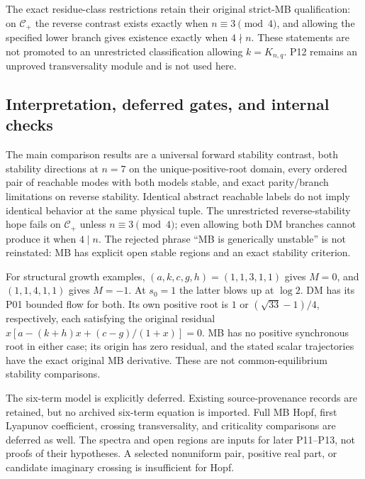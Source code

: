 \documentclass[11pt]{article}
\theoremstyle{definition}
\theoremstyle{remark}
\begin{document}
The exact residue-class restrictions retain their original strict-MB
qualification: on $\mathcal C_+$ the reverse contrast exists exactly
when $n\equiv3\pmod4$, and allowing the specified lower branch gives
existence exactly when $4\nmid n$. These statements are not promoted
to an unrestricted classification allowing $k=K_{n,q}$.
P12 remains an unproved transversality module and is not used here.

\subsection{Interpretation, deferred gates, and internal checks}
\label{slot:P08-6}
The main comparison results are a universal forward stability
contrast, both stability directions at $n=7$ on the unique-positive-root
domain, every ordered pair of reachable modes with both models stable,
and exact parity/branch limitations on reverse stability. Identical
abstract reachable labels do not imply identical behavior at the same
physical tuple. The unrestricted reverse-stability hope fails on
$\mathcal C_+$ unless $n\equiv3\pmod4$; even allowing both DM
branches cannot produce it when $4\mid n$.
The rejected phrase ``MB is generically unstable'' is not reinstated:
MB has explicit open stable regions and an exact stability criterion.

For structural growth examples, $(a,k,c,g,h)=(1,1,3,1,1)$ gives
$M=0$, and $(1,1,4,1,1)$ gives $M=-1$. At $s_0=1$ the latter blows
up at $\log2$. DM has its P01 bounded flow for both. Its own positive
root is $1$ or $(\sqrt{33}-1)/4$, respectively, each satisfying the
original residual $x[a-(k+h)x+(c-g)/(1+x)]=0$.
MB has no positive synchronous root in either case; its origin has zero
residual, and the stated scalar trajectories have the exact original
MB derivative. These are not common-equilibrium stability comparisons.

\label{slot:P08-extra-1}
The six-term model is explicitly deferred. Existing source-provenance
records are retained, but no archived six-term equation is imported.
Full MB Hopf, first Lyapunov coefficient, crossing transversality, and
criticality comparisons are deferred as well. The spectra and open
regions are inputs for later P11--P13, not proofs of their hypotheses.
A selected nonuniform pair, positive real part, or candidate imaginary
crossing is insufficient for Hopf. 


\end{document}

